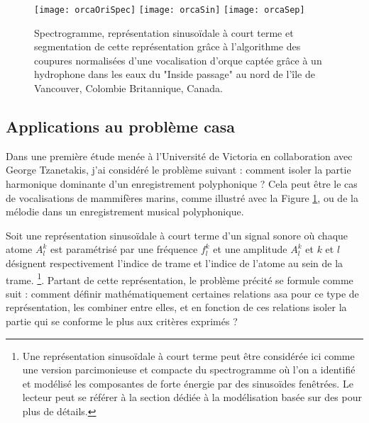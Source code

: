 \begin{figure}[t]
  \texttt{[image: orcaOriSpec]}
  \texttt{[image: orcaSin]}
  \texttt{[image: orcaSep]}
  \label{fig:orca}
  \caption{Spectrogramme, représentation sinusoïdale à court terme et segmentation de cette représentation grâce à l'algorithme des coupures normalisées d'une vocalisation d'orque captée grâce à un hydrophone dans les eaux du "Inside passage" au nord de l'île de Vancouver, Colombie Britannique, Canada.}
\end{figure}

\subsection{Applications au problème casa}


Dans une première étude menée à l'Université de Victoria en collaboration avec George Tzanetakis, j'ai considéré le problème suivant : comment isoler la partie harmonique dominante d'un enregistrement polyphonique ?  Cela peut être le cas de vocalisations de mammifères marins, comme illustré avec la Figure \ref{fig:orca}, ou de la mélodie dans un enregistrement musical polyphonique.

Soit une représentation sinusoïdale à court terme d'un signal sonore où chaque atome $A_l^k$ est paramétrisé par une fréquence $f_l^k$ et une amplitude $A_l^k$ et $k$ et $l$ désignent respectivement l'indice de trame et l'indice de l'atome au sein de la trame. \footnote{Une représentation sinusoïdale à court terme peut être considérée ici comme une version parcimonieuse et compacte du spectrogramme où l'on a identifié et modélisé les composantes de forte énergie par des sinusoïdes fenêtrées. Le lecteur peut se référer à la section dédiée à la modélisation basée sur des   pour plus de détails.}. Partant de cette représentation, le problème précité se formule comme suit : comment définir mathématiquement certaines relations asa pour ce type de représentation, les combiner entre elles, et en fonction de ces relations isoler la partie qui se conforme le plus aux critères exprimés ?

